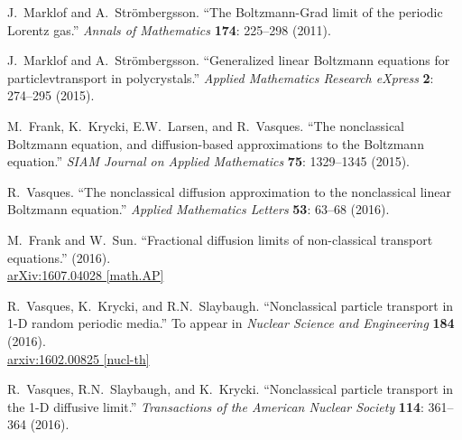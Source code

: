 \documentclass[12pt]{article}
\begin{document}
\begin{thebibliography}{10}
J.~Marklof and A.~Str\"ombergsson.
``The Boltzmann-Grad limit of the periodic Lorentz gas.''
\textit{Annals of Mathematics} \textbf{174}: 225--298 (2011).
\vspace{-5pt}

J.~Marklof and A.~Str\"ombergsson.
``Generalized linear Boltzmann equations for particlevtransport in polycrystals.''
\textit{Applied Mathematics Research eXpress} \textbf{2}: 274--295 (2015).
\vspace{-5pt}

M.~Frank, K.~Krycki, E.W.~Larsen, and R.~Vasques.
``The nonclassical Boltzmann equation, and diffusion-based approximations to the Boltzmann equation.''
\textit{SIAM Journal on Applied Mathematics} \textbf{75}: 1329--1345 (2015). \vspace{-5pt}

R.~Vasques.
``The nonclassical diffusion approximation to the nonclassical linear Boltzmann equation.''
\textit{Applied Mathematics Letters} \textbf{53}: 63--68 (2016).
\vspace{-5pt}

M.~Frank and W.~Sun.
``Fractional diffusion limits of non-classical transport equations.'' (2016).\\
\href{http://arxiv.org/pdf/1607.04028.pdf}{arXiv:1607.04028 [math.AP]} 
\vspace{-5pt}

R.~Vasques, K.~Krycki, and R.N.~Slaybaugh.
``Nonclassical particle transport in 1-D random periodic media.''
To appear in \textit{Nuclear Science and Engineering} \textbf{184} (2016).\\
\href{http://arxiv.org/pdf/1602.00825v2.pdf}{arxiv:1602.00825 [nucl-th]} \vspace{-5pt}

R.~Vasques, R.N.~Slaybaugh, and K.~Krycki.
``Nonclassical particle transport in the 1-D diffusive limit.''
\textit{Transactions of the American Nuclear Society} \textbf{114}: 361--364 (2016).
\vspace{-5pt}


\end{thebibliography}
\end{document}

